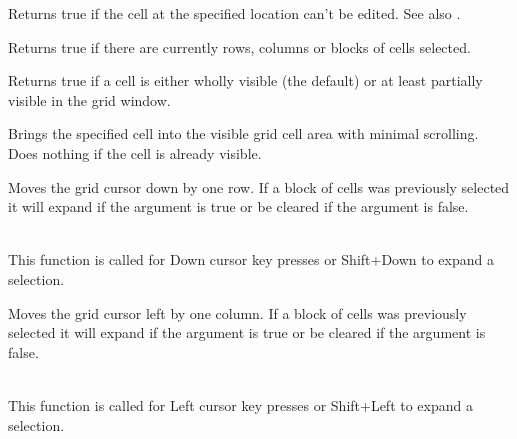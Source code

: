 Returns true if the cell at the specified location can't be edited.
See also .

\label{wxgridisselection}


Returns true if there are currently rows, columns or blocks of cells selected.

\label{wxgridisvisible}



Returns true if a cell is either wholly visible (the default) or at least partially
visible in the grid window.

\label{wxgridmakecellvisible}



Brings the specified cell into the visible grid cell area with minimal scrolling. Does
nothing if the cell is already visible. 

\label{wxgridmovecursordown}


Moves the grid cursor down by one row. If a block of cells was previously selected it
will expand if the argument is true or be cleared if the argument is false.

\\
This function is called for Down cursor key presses or Shift+Down to expand a selection.

\label{wxgridmovecursorleft}


Moves the grid cursor left by one column. If a block of cells was previously selected it
will expand if the argument is true or be cleared if the argument is false.

\\
This function is called for Left cursor key presses or Shift+Left to expand a selection.

